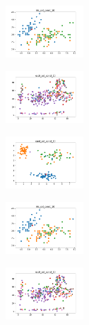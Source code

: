 \begin{figure}[H]    
    \centering
    \begin{subfigure}
        \centering
        \includegraphics[width=0.32\textwidth]{img/bl/iris_set_const_10_949004259_clust.png}
    \end{subfigure}
    \hfill
    \begin{subfigure}
        \centering
        \includegraphics[width=0.32\textwidth]{img/bl/ecoli_set_const_10_949004259_clust.png}
    \end{subfigure}
    \hfill
    \begin{subfigure}
        \centering
        \includegraphics[width=0.32\textwidth]{img/bl/rand_set_const_10_949004259_clust.png}
    \end{subfigure}
    \hfill
    \begin{subfigure}
        \centering
        \includegraphics[width=0.32\textwidth]{img/bl/iris_set_const_10_589741062_clust.png}
    \end{subfigure}
    \hfill
    \begin{subfigure}
        \centering
        \includegraphics[width=0.32\textwidth]{img/bl/ecoli_set_const_10_589741062_clust.png}

\end{subfigure}
\end{figure}
